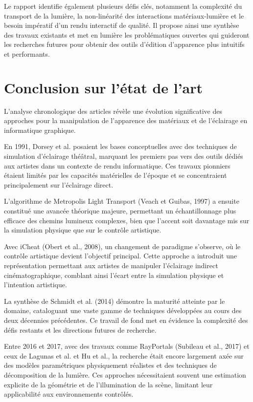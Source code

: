 \documentclass{article}
\begin{document}
Le rapport identifie également plusieurs défis clés, notamment la complexité du transport de la lumière, la non-linéarité des interactions 
matériaux-lumière et le besoin impératif d’un rendu interactif de qualité. Il propose ainsi une synthèse des travaux existants et met en lumière
les problématiques ouvertes qui guideront les recherches futures pour obtenir des outils d’édition d’apparence plus intuitifs et performants.

\newpage
\section{Conclusion sur l'état de l'art}

L'analyse chronologique des articles révèle une évolution significative des approches pour la manipulation de l'apparence des matériaux et de l'éclairage en informatique graphique.

En 1991, Dorsey et al. posaient les bases conceptuelles avec des techniques de simulation d'éclairage théâtral, marquant les premiers pas vers des outils dédiés aux artistes dans un contexte de rendu informatique. Ces travaux pionniers étaient limités par les capacités matérielles de l'époque et se concentraient principalement sur l'éclairage direct.

L'algorithme de Metropolis Light Transport (Veach et Guibas, 1997) a ensuite constitué une avancée théorique majeure, permettant un échantillonnage plus efficace des chemins lumineux complexes, bien que l'accent soit davantage mis sur la simulation physique que sur le contrôle artistique.

Avec iCheat (Obert et al., 2008), un changement de paradigme s'observe, où le contrôle artistique devient l'objectif principal. Cette approche a introduit une représentation permettant aux artistes de manipuler l'éclairage indirect cinématographique, comblant ainsi l'écart entre la simulation physique et l'intention artistique.

La synthèse de Schmidt et al. (2014) démontre la maturité atteinte par le domaine, cataloguant une vaste gamme de techniques développées au cours des deux décennies précédentes. Ce travail de fond met en évidence la complexité des défis restants et les directions futures de recherche.

Entre 2016 et 2017, avec des travaux comme RayPortals (Subileau et al., 2017) et ceux de Lagunas et al. et Hu et al., la recherche était encore largement axée sur des modèles paramétriques physiquement réalistes et des techniques de décomposition de la lumière. Ces approches nécessitaient souvent une estimation explicite de la géométrie et de l'illumination de la scène, limitant leur applicabilité aux environnements contrôlés.
\end{document}
